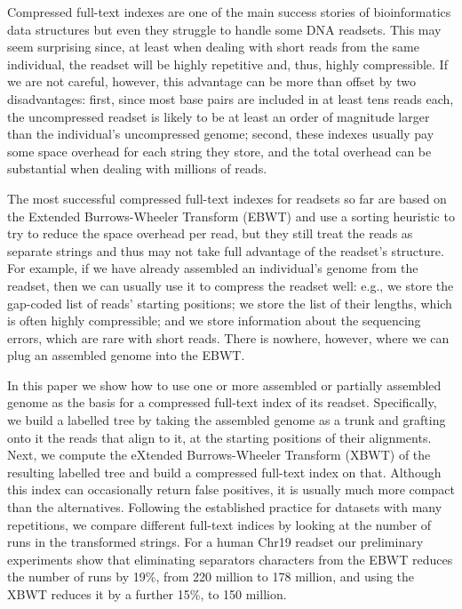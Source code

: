 

\newcommand{\inputXBWT}[1]{}
\newcommand{\figXBWT}[2]{\texttt{[image: Part\_Two/xbwt/\#2]}}

\begin{small}

Compressed full-text indexes are one of the main success stories of bioinformatics data structures but even they struggle to handle some DNA readsets.  This may seem surprising since, at least when dealing with short reads from the same individual, the readset will be highly repetitive and, thus, highly compressible.  If we are not careful, however, this advantage can be more than offset by two disadvantages: first, since most base pairs are included in at least tens reads each, the uncompressed readset is likely to be at least an order of magnitude larger than the individual's uncompressed genome; second, these indexes usually pay some space overhead for each string they store, and the total overhead can be substantial when dealing with millions of reads.


The most successful compressed full-text indexes for readsets so far are based on the Extended Burrows-Wheeler Transform (EBWT) and use a sorting heuristic to try to reduce the space overhead per read, but they still treat the reads as separate strings and thus may not take full advantage of the readset's structure.  For example, if we have already assembled an individual's genome from the readset, then we can usually use it to compress the readset well: e.g., we store the gap-coded list of reads' starting positions; we store the list of their lengths, which is often highly compressible; and we store information about the sequencing errors, which are rare with short reads.  There is nowhere, however, where we can plug an assembled genome into the EBWT.

In this paper we show how to use one or more assembled or partially assembled genome as the basis for a compressed full-text index of its readset.  Specifically, we build a labelled tree by taking the assembled genome as a trunk and grafting onto it the reads that align to it, at the starting positions of their alignments.  Next, we compute the eXtended Burrows-Wheeler Transform (XBWT) of the resulting labelled tree and build a compressed full-text index on that. Although this index can occasionally return false positives, it is usually much more compact than the alternatives.
Following the established practice for datasets with many repetitions, we compare different full-text indices by looking at the number of runs in the transformed strings. For a human Chr19 readset our preliminary experiments show that eliminating separators characters from the EBWT reduces the number of runs by 19\%, from 220 million to 178 million, and using the XBWT reduces it by a further 15\%, to 150 million.

\end{small}

